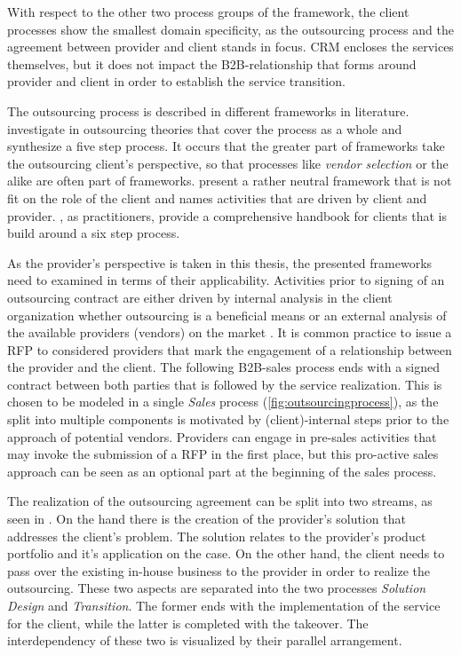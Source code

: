 	With respect to the other two process groups of the framework, the client  processes show the smallest domain specificity, as the outsourcing process and the agreement between provider and client stands in focus. \acrshort{CRM} encloses the services themselves, but it does not impact the B2B-relationship that forms around provider and client in order to establish the service transition. 
	
	The outsourcing process is described in different frameworks in literature. \citep{perunovic2007outsourcing} investigate in outsourcing theories that cover the process as a whole and synthesize a five step process. It occurs that the greater part of frameworks take the outsourcing client's perspective, so that processes like \textit{vendor selection} or the alike are often part of frameworks. \citep{Agarwal_2008} present a rather neutral framework that is not fit on the role of the client and names activities that are driven by client and provider. \citep{deloittehandbook}, as practitioners, provide a comprehensive handbook for clients that is build around a six step process. 
	
	As the provider's perspective is taken in this thesis, the presented frameworks need to examined in terms of their applicability. Activities prior to signing of an outsourcing contract are either driven by internal analysis in the client organization whether outsourcing is a beneficial means or an external analysis of the available providers (vendors) on the market \citep{Franceschini_2003}. It is common practice to issue a \acrfull{RFP} to considered providers that mark the engagement of a relationship between the provider and the client. The following B2B-sales process ends with a signed contract between both parties that is followed by the service realization. This is chosen to be modeled in a single \textit{Sales} process (\cf \Fig \ref{fig:outsourcingprocess}), as the split into multiple components is motivated by (client)-internal steps prior to the approach of potential vendors. Providers can engage in pre-sales activities that may invoke the submission of a \acrshort{RFP} in the first place, but this pro-active sales approach can be seen as an optional part at the beginning of the sales process.
	
	The realization of the outsourcing agreement can be split into two streams, as seen in \citep{Agarwal_2008}. On the hand there is the creation of the provider's solution that addresses the client's problem. The solution relates to the provider's product portfolio and it's application on the case.  On the other hand, the client needs to pass over the existing in-house business to the provider in order to realize the outsourcing. These two aspects are separated into the two processes \textit{Solution Design} and \textit{Transition}. The former ends with the implementation of the service for the client, while the latter is completed with the takeover. The interdependency of these two is visualized by their parallel arrangement. 
	
